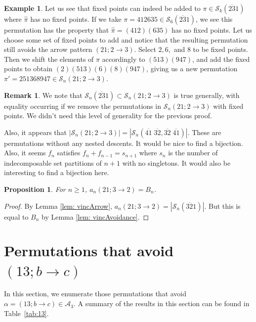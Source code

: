 \documentclass[11pt]{article}
\newcommand{\ol}[1]{\overline{#1}}
\renewcommand\S{\mathcal S}
\newcommand\A{\mathcal A}
\newtheorem{proposition}[theorem]{Proposition}
\theoremstyle{definition}
\newtheorem{remark}[theorem]{Remark}
\newtheorem{example}[theorem]{Example}
\begin{document}
\begin{example}
    Let us see that fixed points can indeed be added to $\pi\in\S_k(\ol{23}1)$ where $\hat\pi$ has no fixed points. If we take $\pi = 412635\in\S_6(\ol{23}1)$, we see this permutation has the property that $\hat\pi=(412)(635)$ has no fixed points. Let us choose some set of fixed points to add and notice that the resulting permutation still avoids the arrow pattern $(21;2\to3).$ Select $2, 6,$ and 8 to be fixed points. Then we shift the elements of $\hat\pi$ accordingly to $(513)(947)$, and add the fixed points to obtain $(2)(513)(6)(8)(947)$, giving us a new permutation $\pi' = 251368947\in\S_n(21;2\to3).$
\end{example}

\begin{remark}
    We note that $\S_n(\ol{23}1) \subset \S_n(21; 2 \to 3)$ is true generally, with equality occurring if we remove the permutations in $\S_n(21;2\to3)$ with fixed points. We didn't need this level of generality for the previous proof.

    Also, it appears that $|\S_n(21;2\to3)| = |\S_n(\ol{41}\; \ol{32}, \ol{32} \; \ol{41})|$. These are permutations without any nested descents. It would be nice to find a bijection. Also, it seems $f_n$ satisfies $f_n + f_{n-1} = s_{n+1}$ where $s_n$ is the number of indecomposable set partitions of $n+1$ with no singletons. It would also be interesting to find a bijection here.
\end{remark}



\begin{proposition} \label{prop: 21t32}
    For $n \geq 1$, $a_n(21;3 \to 2) = B_n$.
\end{proposition}

\begin{proof}
    By Lemma \ref{lem: vincArrow}, $a_n(21; 3 \to 2) = |\S_n(\ol{32} 1)|$. But this is equal to $B_n$ by Lemma \ref{lem: vincAvoidance}.
\end{proof}


\section{Permutations that avoid $(13;b\to c)$}\label{sec:13tbc}


In this section, we enumerate those permutations that avoid $\alpha=(13; b\to c)\in\A_3.$ A summary of the results in this section can be found in Table~\ref{tab:13}.
\end{document}
